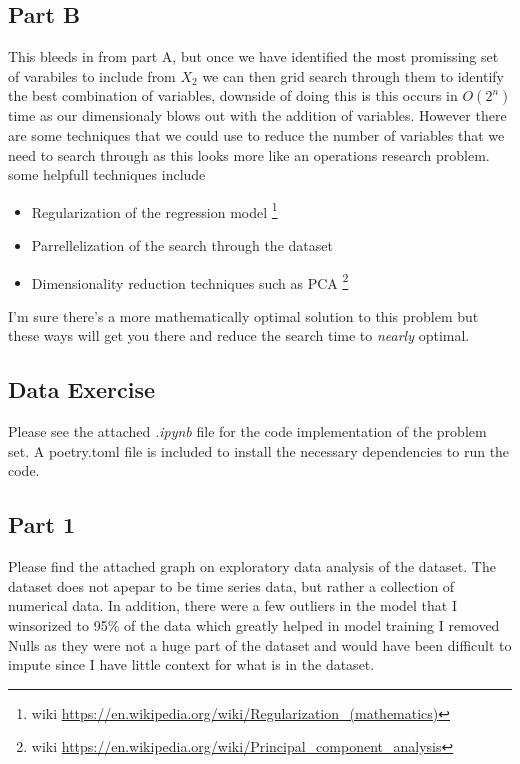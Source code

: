 \documentclass{article}
\begin{document}
\subsection*{Part B}

This bleeds in from part A, but once we have identified the most promissing set of varabiles to include from $X_2$ we can then grid search through them to identify the best combination of variables, 
downside of doing this is this occurs in $O(2^n)$ time as our dimensionaly blows out with the addition of variables.
However there are some techniques that we could use to reduce the number of variables that we need to search through as this looks more like an operations research problem.
some helpfull techniques include 
\begin{itemize}
    \item Regularization of the regression model \footnote[3]{wiki \url{https://en.wikipedia.org/wiki/Regularization_(mathematics)}}
    \item Parrellelization of the search through the dataset
    \item Dimensionality reduction techniques such as PCA \footnote[4]{wiki \url{https://en.wikipedia.org/wiki/Principal_component_analysis}}
\end{itemize}

I'm sure there's a more mathematically optimal solution to this problem but these ways will get you there and reduce the search time to \textit{nearly} optimal.

\subsection*{Data Exercise}
Please see the attached \textit{.ipynb} file for the code implementation of the problem set. \newline
A poetry.toml file is included to install the necessary dependencies to run the code.

\subsection*{Part 1}
Please find the attached graph on exploratory data analysis of the dataset.
The dataset does not apepar to be time series data, but rather a collection of numerical data.
In addition, there were a few outliers in the model that I winsorized to 95\% of the data which greatly helped in model training
I removed Nulls as they were not a huge part of the dataset and would have been difficult to impute since I have little context for what is in the dataset.
\end{document}
